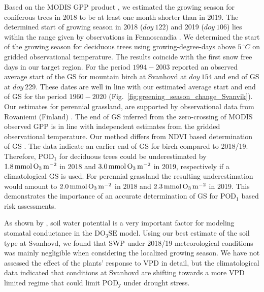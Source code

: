 \documentclass[bg, manuscript]{copernicus}
\begin{document}
Based on the MODIS GPP product \citep{MODIS_PSN}, we estimated the growing season for coniferous trees in 2018 to be at least one month shorter than in 2019. The determined start of growing season in 2018 ($\unit{doy}~122$) and 2019 ($\unit{doy}~106$) lies within the range given by observations in Fennoscandia \citep{TB:Kolari2007,IVL:Karlsson2018}. We determined the start of the growing season for deciduous trees using growing-degree-days above $5\,\unit{^\circ C}$ on gridded observational temperature. The results coincide with the first snow free days in our target region.
For the period $1994-2003$ \citet{IJB:Shutova2006} reported an observed average start of the GS for mountain birch at Svanhovd at $\unit{doy}~154$ and end of GS at $\unit{doy}~ 229$. These dates are well in line with our estimated average start and end of GS for the period $1960-2020$ (Fig.~\ref{fig:greening_season_change_Svanvik}).
Our estimates for perennial grassland, are supported by observational data from Rovaniemi (Finland) \citep{FCR:Korhonen2018}. The end of GS inferred from the zero-crossing of MODIS observed GPP is in line with independent estimates from the gridded observational temperature. Our method differs from NDVI based determination of GS \citep{IGARSS:Hogda2001,IJB:Karlsen2007, RS:Hogda2013}.
The \citet{IJB:Shutova2006} data indicate an earlier end of GS for birch compared to 2018/19. Therefore, $\mathrm{POD_1}$ for deciduous trees could be underestimated by $1.8\,\unit{mmol\,\chem{O_3}\,m^{-2}}$ in 2018 and $3.0\,\unit{mmol\,\chem{O_3}\,m^{-2}}$ in 2019, respectively if a climatological GS is used. For perennial grassland the resulting underestimation would amount to $2.0\,\unit{mmol\,\chem{O_3}\,m^{-2}}$ in 2018 and $2.3\,\unit{mmol\,\chem{O_3}\,m^{-2}}$ in 2019. This demonstrates the importance of an accurate determination of GS for $\mathrm{POD_1}$ based risk assessments.

As shown by \citet{ACP:Bueker2012}, soil water potential is a very important factor for modeling stomatal conductance in the $\mathrm{DO_3SE}$ model. Using our best estimate of the soil type at Svanhovd, we found that SWP under 2018/19 meteorological conditions was mainly negligible when considering the localized growing season. We have not assessed the effect of the plants' response to VPD in detail, but the climatological data indicated that conditions at Svanhovd are shifting towards a more VPD limited regime that could limit $\mathrm{POD_y}$ under drought stress. 
\end{document}
